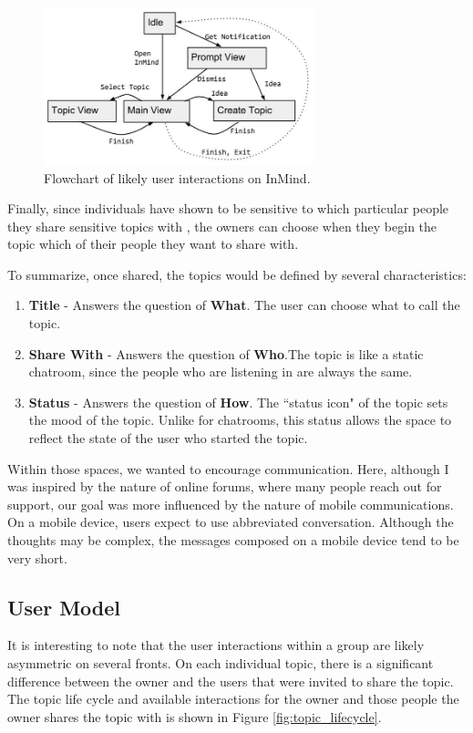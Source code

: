   \begin{figure}
  \centering
  \includegraphics[width=0.7\textwidth]{user_interaction.jpg}
  \caption{Flowchart of likely user interactions on InMind.}
  \label{fig:user_interaction}
  \end{figure}

  Finally, since individuals have shown to be sensitive
  to which particular people they share
  sensitive topics with \cite{patil05},
  the owners can choose when they begin the topic
  which of their people they want to share with.

  To summarize, once shared, the topics would be defined by several characteristics:

  \begin{enumerate}
  \item \textbf{Title} - Answers the question of \textbf{What}. The user can choose what to call the topic.
  \item \textbf{Share With} - Answers the question of \textbf{Who}.The topic is like a static chatroom,
    since the people who are listening in are always the same.
  \item \textbf{Status} - Answers the question of \textbf{How}. The ``status icon" of the topic sets the mood
    of the topic. Unlike for chatrooms,
    this status allows the space to reflect the state
    of the user who started the topic.
  \end{enumerate}

  Within those spaces, we wanted to encourage communication.
  Here, although I was inspired by the nature of online forums,
  where many people reach out for support,
  our goal was more influenced by the nature of mobile communications.
  On a mobile device, users expect to use abbreviated conversation.
  Although the thoughts may be complex, the messages composed on a mobile device
  tend to be very short.

    \subsection{User Model}
      It is interesting to note that the user interactions within a group
      are likely asymmetric on several fronts.
      On each individual topic, there is a significant difference between the owner
      and the users that were invited to share the topic.
      The topic life cycle and available interactions for the owner
      and those people the owner shares the topic with
      is shown in Figure \ref{fig:topic_lifecycle}.

